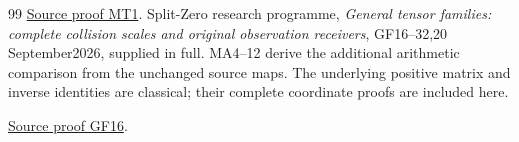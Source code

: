 \documentclass[11pt]{article}
\begin{document}
\begin{thebibliography}{99}
\href{https://github.com/KokunoYumeto/zeta-function-research-reader/blob/main/workbenches/splitzero-tandem/continuations/20260921-kernel-degree-steps/providers/OBSERVATION_COMPLETE_PROOFS.tex\#L1629}{Source proof MT1}.
 Split-Zero research programme, \emph{General tensor families:
complete collision scales and original observation receivers},
GF16--32,20 September2026, supplied in full. MA4--12 derive the
additional arithmetic comparison from the unchanged source maps.
The underlying positive matrix and inverse identities are classical;
their complete coordinate proofs are included here.


\href{https://github.com/KokunoYumeto/zeta-function-research-reader/blob/main/workbenches/splitzero-tandem/continuations/20260921-kernel-degree-steps/providers/OBSERVATION_COMPLETE_PROOFS.tex\#L1383}{Source proof GF16}.
\end{thebibliography}
\end{document}
